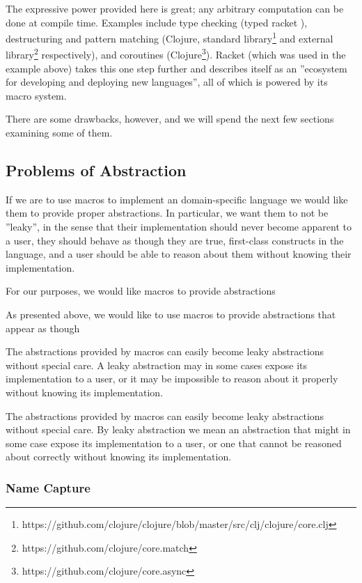 \documentclass{kththesis}
\begin{document}
The expressive power provided here is great; any arbitrary computation can be done at compile time. Examples include type checking (typed racket \cite{Tobin-Hochstadt:2011:LL:1993498.1993514}), destructuring and pattern matching (Clojure, standard library\footnote{https://github.com/clojure/clojure/blob/master/src/clj/clojure/core.clj} and external library\footnote{https://github.com/clojure/core.match} respectively), and coroutines (Clojure\footnote{https://github.com/clojure/core.async}). Racket (which was used in the example above) takes this one step further and describes itself as an ''ecosystem for developing and deploying new languages'', all of which is powered by its macro system.

There are some drawbacks, however, and we will spend the next few sections examining some of them.

\subsection{Problems of Abstraction} \label{sec:problem-abstraction}

If we are to use macros to implement an domain-specific language we would like them to provide proper abstractions. In particular, we want them to not be ''leaky'', in the sense that their implementation should never become apparent to a user, they should behave as though they are true, first-class constructs in the language, and a user should be able to reason about them without knowing their implementation.

For our purposes, we would like macros to provide abstractions

As presented above, we would like to use macros to provide abstractions that appear as though

The abstractions provided by macros can easily become leaky abstractions without special care. A leaky abstraction may in some cases expose its implementation to a user, or it may be impossible to reason about it properly without knowing its implementation.

The abstractions provided by macros can easily become leaky abstractions without special care. By leaky abstraction we mean an abstraction that might in some case expose its implementation to a user, or one that cannot be reasoned about correctly without knowing its implementation.

\subsubsection{Name Capture}
\end{document}
